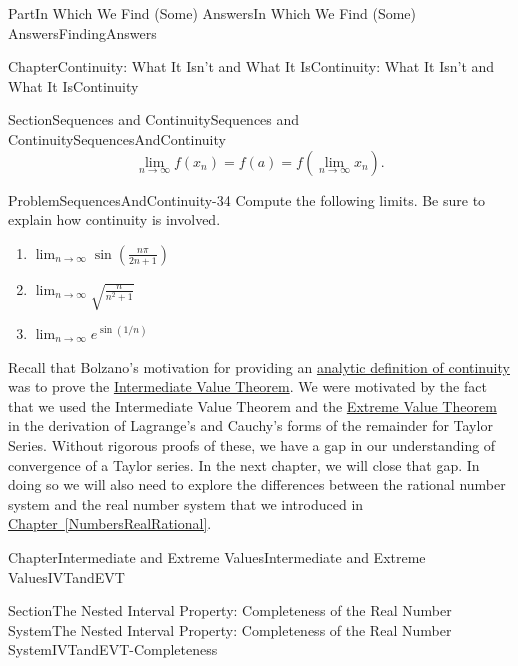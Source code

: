 \documentclass[oneside,10pt,]{book}
\newcommand{\xreffont}{\relax}
\numberwithin{equation}{part}
\def\limit#1#2#3{{\displaystyle\lim_{#1\rightarrow #2}#3}}
\begin{document}
\begin{partptx}{Part}{In Which We Find (Some) Answers}{}{In Which We Find (Some) Answers}{}{}{FindingAnswers}
\begin{chapterptx}{Chapter}{Continuity: What It Isn't and What It Is}{}{Continuity: What It Isn't and What It Is}{}{}{Continuity}
\begin{sectionptx}{Section}{Sequences and Continuity}{}{Sequences and Continuity}{}{}{SequencesAndContinuity}
\begin{equation*}
\limit{n}{\infty}{f(x_n)}=f(a)=f\left(\limit{n}{\infty}{x_n}\right)\text{.}
\end{equation*}
%
\begin{problem}{Problem}{}{SequencesAndContinuity-34}%
Compute the following limits.  Be sure to explain how continuity is involved.%
\begin{enumerate}[font=\bfseries,label=(\alph*),ref=\alph*]%
\item{}\(\limit{n}{\infty}{\sin\left(\frac{n\pi}{2n+1}\right)}\)%
\item{}\(\limit{n}{\infty}{\sqrt{\frac{n}{n^2+1}}}\)%
\item{}\(\limit{n}{\infty}{e^{\sin (1/n)}}\)%
\end{enumerate}%
\end{problem}
Recall that Bolzano's motivation for providing an \hyperref[def_continuity]{analytic definition of continuity} was to prove the \hyperref[IntermediateValueTheorem]{Intermediate Value Theorem}.  We were motivated by the fact that we used the Intermediate Value Theorem and the \hyperref[thm_EVT]{Extreme Value Theorem} in the derivation of Lagrange's and Cauchy's forms of the remainder for Taylor Series.  Without rigorous proofs of these, we have a gap in our understanding of convergence of a Taylor series.  In the next chapter, we will close that gap.  In doing so we will also need to explore the differences between the rational number system and the real number system that we introduced in \hyperref[NumbersRealRational]{Chapter~{\xreffont\ref{NumbersRealRational}}}.     %
\end{sectionptx}
\end{chapterptx}
%
%
\typeout{************************************************}
\typeout{************************************************}
%
\begin{chapterptx}{Chapter}{Intermediate and Extreme Values}{}{Intermediate and Extreme Values}{}{}{IVTandEVT}
\renewcommand*{\chaptername}{Chapter}
%
%
\typeout{************************************************}
\typeout{************************************************}
%
\begin{sectionptx}{Section}{The Nested Interval Property: Completeness of the Real Number System}{}{The Nested Interval Property: Completeness of the Real Number System}{}{}{IVTandEVT-Completeness}

\end{sectionptx}
\end{chapterptx}
\end{partptx}
\end{document}

